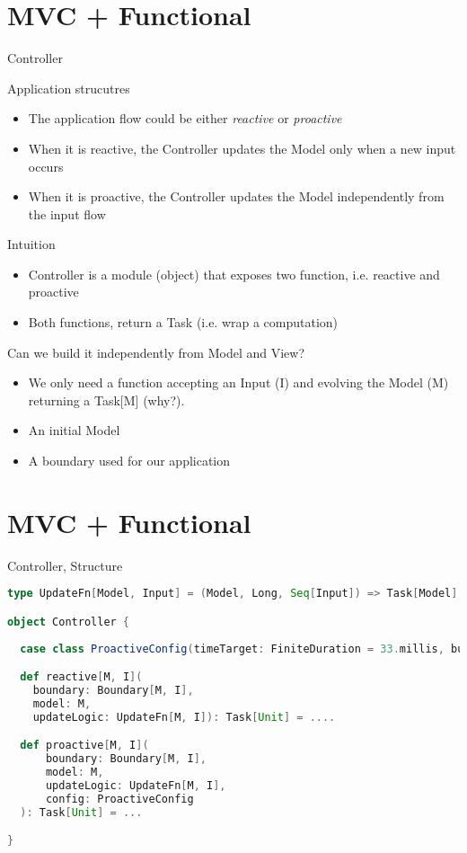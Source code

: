 \documentclass[presentation]{beamer}
\begin{document}
\section{MVC + Functional}
\begin{frame}[fragile]{Controller}
\begin{block}{Application strucutres}
\begin{itemize}
\item The application flow could be either \emph{reactive} or \emph{proactive}
\item When it is reactive, the Controller updates the Model only when a new input occurs
\item When it is proactive, the Controller updates the Model independently from the input flow
\end{itemize}
\end{block}
\begin{block}{Intuition}
\begin{itemize}
\item Controller is a module (object) that exposes two function, i.e. reactive and proactive
\item Both functions, return a Task (i.e. wrap a computation)
\end{itemize}
\end{block}
\begin{block}{Can we build it independently from Model and View?}
\begin{itemize}
\item We only need a function accepting an Input (I) and evolving the Model (M) returning a Task[M] (why?).
\item An initial Model
\item A boundary used for our application
\end{itemize}
\end{block}
\end{frame}
\section{MVC + Functional}
\begin{frame}[fragile]{Controller, Structure}
\begin{lstlisting}[language=Scala]
type UpdateFn[Model, Input] = (Model, Long, Seq[Input]) => Task[Model]

object Controller {
  
  case class ProactiveConfig(timeTarget: FiniteDuration = 33.millis, bufferSize: Int = 5)

  def reactive[M, I](
    boundary: Boundary[M, I], 
    model: M, 
    updateLogic: UpdateFn[M, I]): Task[Unit] = ....

  def proactive[M, I](
      boundary: Boundary[M, I],
      model: M,
      updateLogic: UpdateFn[M, I],
      config: ProactiveConfig
  ): Task[Unit] = ...

}
\end{lstlisting}
\end{frame}
\end{document}

